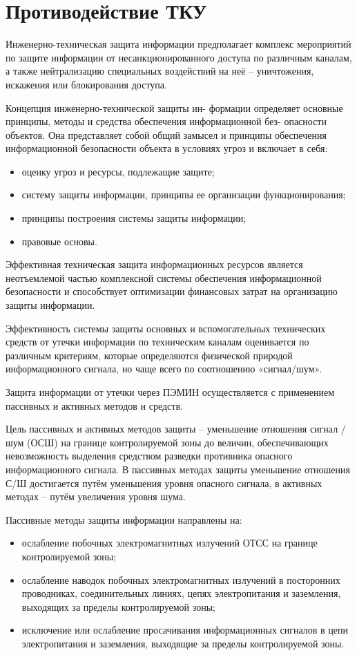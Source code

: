 \section{Противодействие ТКУ}

Инженерно-техническая защита информации предполагает комплекс мероприятий по защите информации от несанкционированного доступа по различным каналам, а также нейтрализацию специальных воздействий на неё – уничтожения, искажения или блокирования доступа.

Концепция инженерно-технической защиты ин- формации определяет основные принципы, методы и средства обеспечения информационной без- опасности объектов. Она представляет собой общий замысел и принципы обеспечения информационной безопасности объекта в условиях угроз и включает в себя:

\begin{itemize}
	\item оценку угроз и ресурсы, подлежащие защите;
	\item систему защиты информации, принципы ее организации функционирования;
	\item принципы построения системы защиты информации;
	\item правовые основы.
\end{itemize}

Эффективная техническая защита информационных ресурсов является неотъемлемой частью комплексной системы обеспечения информационной безопасности и способствует оптимизации финансовых затрат на организацию защиты информации.

Эффективность системы защиты основных и вспомогательных технических средств от утечки информации по техническим каналам оценивается по различным критериям, которые определяются физической природой информационного сигнала, но чаще всего по соотношению «сигнал/шум».

Защита информации от утечки через ПЭМИН осуществляется с применением пассивных и активных методов и средств.

Цель пассивных и активных методов защиты – уменьшение отношения сигнал / шум (ОСШ) на границе контролируемой зоны до величин, обеспечивающих невозможность выделения средством разведки противника опасного информационного сигнала. В пассивных методах защиты уменьшение отношения С/Ш достигается путём уменьшения уровня опасного сигнала, в активных методах – путём увеличения уровня шума.

Пассивные методы защиты информации направлены на:
\begin{itemize}
	\item ослабление побочных электромагнитных излучений ОТСС на границе контролируемой зоны;
	\item  ослабление наводок побочных электромагнитных излучений в посторонних проводниках, соединительных линиях, цепях электропитания и заземления, выходящих за пределы контролируемой зоны;
	\item исключение или ослабление просачивания информационных сигналов в цепи электропитания и заземления, выходящие за пределы контролируемой зоны.
\end{itemize}

